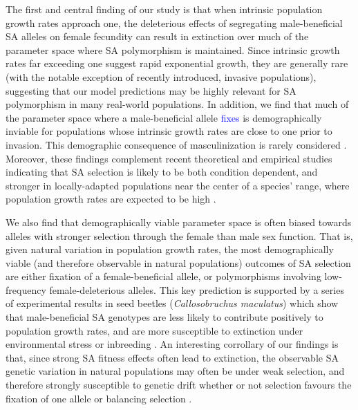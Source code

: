\documentclass[11pt]{article}
\begin{document}
The first and central finding of our study is that when intrinsic population growth rates approach one, the deleterious effects of segregating male-beneficial SA alleles on female fecundity can result in extinction over much of the parameter space where SA polymorphism is maintained. Since intrinsic growth rates far exceeding one suggest rapid exponential growth, they are generally rare (with the notable exception of recently introduced, invasive populations), suggesting that our model predictions may be highly relevant for SA polymorphism in many real-world populations. In addition, we find that much of the parameter space where a male-beneficial allele \textcolor{blue}{fixes} is demographically inviable for populations whose intrinsic growth rates are close to one prior to invasion. This demographic consequence of masculinization is rarely considered \citep{hitchcock2020gene}.  Moreover, these findings complement recent theoretical and empirical studies indicating that SA selection is likely to be both condition dependent, and stronger in locally-adapted populations near the center of a species' range, where population growth rates are expected to be high \citep{BergerEtAl2014, Connallon2015}. 

We also find that demographically viable parameter space is often biased towards alleles with stronger selection through the female than male sex function. That is, given natural variation in population growth rates, the most demographically viable (and therefore observable in natural populations) outcomes of SA selection are either fixation of a female-beneficial allele, or polymorphisms involving low-frequency female-deleterious alleles. This key prediction is supported by a series of experimental results in seed beetles ({\itshape Callosobruchus maculatus}) which show that male-beneficial SA genotypes are less likely to contribute positively to population growth rates, and are more susceptible to extinction under environmental stress or inbreeding \citep{BergerEtAl2014, berger2016intralocus, grieshop2017male}. An interesting corrollary of our findings is that, since strong SA fitness effects often lead to extinction, the observable SA genetic variation in natural populations may often be under weak selection, and therefore strongly susceptible to genetic drift whether or not selection favours the fixation of one allele or balancing selection \citep{ConnallonClark2012}. 

\end{document}
